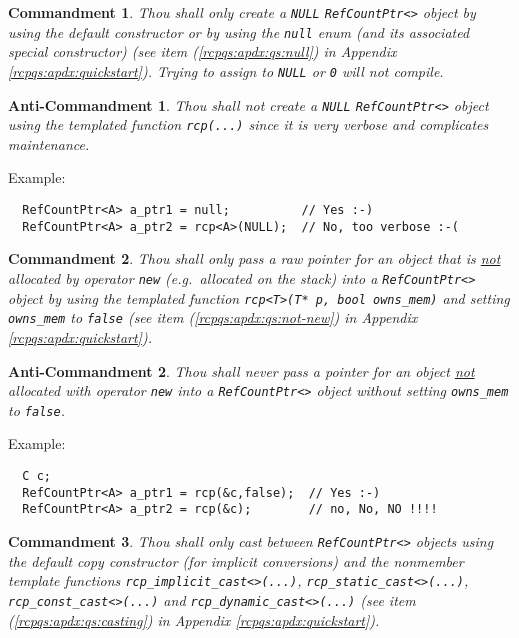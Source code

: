 \documentclass[pdf,ps2pdf,11pt]{SANDreport}
\newtheorem{commandment}{Commandment}
\newtheorem{anticommandment}{Anti-Commandment}
\begin{document}
\begin{commandment}
Thou shall only create a {}\texttt{NULL} {}\texttt{Ref\-Count\-Ptr<>}
object by using the default constructor or by using the
{}\texttt{null} enum (and its associated special constructor) (see
item ({}\ref{rcpqs:apdx:qs:null}) in Appendix
{}\ref{rcpqs:apdx:quickstart}).  Trying to assign to {}\texttt{NULL}
or {}\texttt{0} will not compile.
\end{commandment}

\begin{anticommandment}
Thou shall not create a {}\texttt{NULL} {}\texttt{Ref\-Count\-Ptr<>}
object using the templated function {}\texttt{rcp(...)} since it is
very verbose and complicates maintenance.
\end{anticommandment}

{}\noindent{}Example:
{\small\begin{verbatim}
  RefCountPtr<A> a_ptr1 = null;          // Yes :-)
  RefCountPtr<A> a_ptr2 = rcp<A>(NULL);  // No, too verbose :-(
\end{verbatim}}

\begin{commandment}
Thou shall only pass a raw pointer for an object that is
{}\underline{not} allocated by operator {}\texttt{new} (e.g.~allocated
on the stack) into a {}\texttt{Ref\-Count\-Ptr<>} object by using the
templated function {}\texttt{rcp<T>(T* p, bool owns\_mem)} and setting
{}\texttt{owns\_mem} to {}\texttt{false} (see item
({}\ref{rcpqs:apdx:qs:not-new}) in Appendix
{}\ref{rcpqs:apdx:quickstart}).
\end{commandment}

\begin{anticommandment}
Thou shall never pass a pointer for an object {}\underline{not}
allocated with operator {}\texttt{new} into a
{}\texttt{Ref\-Count\-Ptr<>} object without setting
{}\texttt{owns\_mem} to {}\texttt{false}.
\end{anticommandment}

{}\noindent{}Example:
{\small\begin{verbatim}
  C c;
  RefCountPtr<A> a_ptr1 = rcp(&c,false);  // Yes :-)
  RefCountPtr<A> a_ptr2 = rcp(&c);        // no, No, NO !!!!
\end{verbatim}}

\begin{commandment}\label{rcp:cmnd:converstion}
Thou shall only cast between {}\texttt{Ref\-Count\-Ptr<>} objects
using the default copy constructor (for implicit conversions) and the
nonmember template functions {}\texttt{rcp\-\_implicit\-\_cast<>(\-...)},
{}\texttt{rcp\-\_static\-\_cast<>(\-...)},
{}\texttt{rcp\-\_const\-\_cast<>(\-...)} and
{}\texttt{rcp\-\_dynamic\-\_cast<>(\-...)}  (see item
({}\ref{rcpqs:apdx:qs:casting}) in Appendix
{}\ref{rcpqs:apdx:quickstart}).
\end{commandment}
\end{document}
